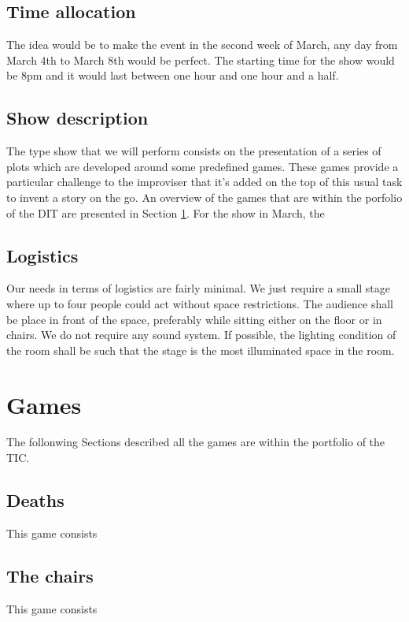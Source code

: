 \documentclass[11pt,a4paper,fleqn,twoside]{article}
\begin{document}
\subsection{Time allocation}

The idea would be to make the event in the second week of March, any day from March 4th to March 8th would be perfect. The starting time for the show would be 8pm and it would last between one hour and one hour and a half.

\subsection{Show description}

The type show that we will perform consists on the presentation of a series of plots which are developed around some predefined games. These games provide a particular challenge to the improviser that it's added on the top of this usual task to invent a story on the go. An overview of the games that are within the porfolio of the DIT are presented in Section \ref{sec:games}. For the show in March, the 	

\subsection{Logistics}

Our needs in terms of logistics are fairly minimal. We just require a small stage where up to four people could act without space restrictions. The audience shall be place in front of the space, preferably while sitting either on the floor or in chairs. We do not require any sound system. If possible, the lighting condition of the room shall be such that the stage is the most illuminated space in the room.

\section{Games} \label{sec:games}

The follonwing Sections described all the games are within the portfolio of the TIC.

\subsection{Deaths}
This game consists

\subsection{The chairs}
This game consists
\end{document}
